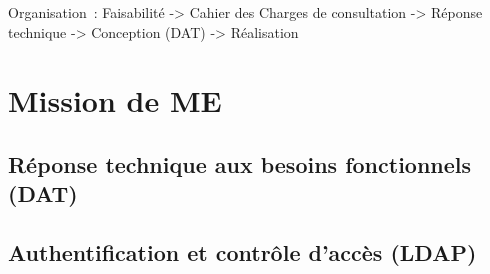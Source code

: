 \documentclass[10pt,fleqn]{beamer}
\begin{document}
Organisation~: Faisabilité -> Cahier des Charges de consultation -> Réponse technique -> Conception (DAT) -> Réalisation

\section[Mission de ME]{Mission de ME}












\subsection[Réponse technique aux besoins fonctionnels (DAT)]{Réponse technique aux besoins fonctionnels (DAT)}

\subsection[Authentification et contrôle d'accès (LDAP)]{Authentification et contrôle d'accès (LDAP)}
\begin{frame}
\tableofcontents[subsectionstyle=show/shaded/hide, subsubsectionstyle=hide, sectionstyle=show/hide]
\end{frame}

\end{document}
